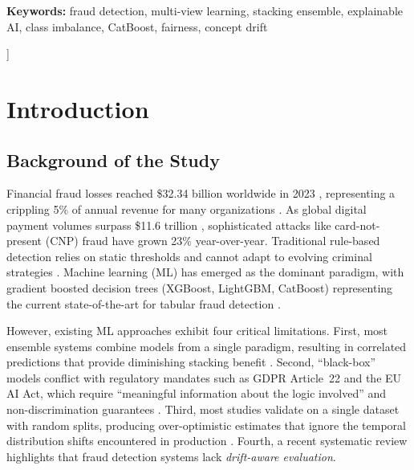 \documentclass[10pt,a4paper,twocolumn]{article}
\begin{document}
{{\begin{minipage}{0.96\textwidth}
\vspace{4pt}
\end{minipage}%
}%
\par\vspace{2pt}
{\small\textbf{Keywords:} fraud detection, multi-view learning, stacking ensemble, explainable AI, class imbalance, CatBoost, fairness, concept drift}
\par\vspace{6pt}
}]%

\section{Introduction}

\subsection{Background of the Study}

Financial fraud losses reached \$32.34 billion worldwide in 2023 \cite{nilson2024}, representing a crippling 5\% of annual revenue for many organizations \cite{acfe2024}. As global digital payment volumes surpass \$11.6 trillion \cite{statista2024}, sophisticated attacks like card-not-present (CNP) fraud have grown 23\% year-over-year. Traditional rule-based detection relies on static thresholds and cannot adapt to evolving criminal strategies \cite{abdallah2016}. Machine learning (ML) has emerged as the dominant paradigm, with gradient boosted decision trees (XGBoost, LightGBM, CatBoost) representing the current state-of-the-art for tabular fraud detection \cite{chen2016, ke2017, prokhorenkova2018}.

However, existing ML approaches exhibit four critical limitations. First, most ensemble systems combine models from a single paradigm, resulting in correlated predictions that provide diminishing stacking benefit \cite{dietterich2000}. Second, ``black-box'' models conflict with regulatory mandates such as GDPR Article~22 and the EU AI Act, which require ``meaningful information about the logic involved'' and non-discrimination guarantees \cite{goodman2017}. Third, most studies validate on a single dataset with random splits, producing over-optimistic estimates that ignore the temporal distribution shifts encountered in production \cite{santos2018}. Fourth, a recent systematic review \cite{khatri2025systematic} highlights that fraud detection systems lack \emph{drift-aware evaluation}.

\end{document}
